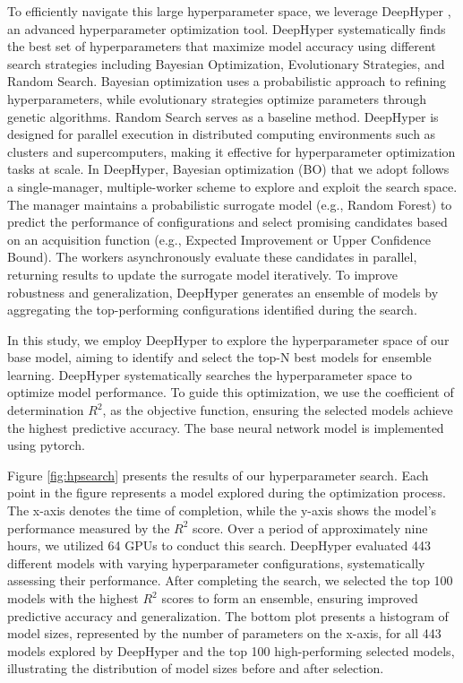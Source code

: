 \documentclass{jpp}
\begin{document}
To efficiently navigate this large hyperparameter space, we leverage DeepHyper \citep{balaprakash2018deephyper, egele2023asynchronous}, an advanced hyperparameter optimization tool. DeepHyper systematically finds the best set of hyperparameters that maximize model accuracy using different search strategies including Bayesian Optimization, Evolutionary Strategies, and Random Search. Bayesian optimization uses a probabilistic approach to refining hyperparameters, while evolutionary strategies optimize parameters through genetic algorithms. Random Search serves as a baseline method. DeepHyper is designed for parallel execution in distributed computing environments such as clusters and supercomputers, making it effective for  hyperparameter optimization tasks at scale. 
In DeepHyper, Bayesian optimization (BO) that we adopt  follows a single-manager, multiple-worker scheme to explore and exploit the search space. The manager maintains a probabilistic surrogate model (e.g., Random Forest) to predict the performance of configurations and select promising candidates based on an acquisition function (e.g., Expected Improvement or Upper Confidence Bound). The workers asynchronously evaluate these candidates in parallel, returning results to update the surrogate model iteratively. To improve robustness and generalization, DeepHyper generates an ensemble of models by aggregating the top-performing configurations identified during the search. 


In this study, we employ DeepHyper to explore the hyperparameter space of our base model, aiming to identify and select the top-N best models for ensemble learning. DeepHyper systematically searches the hyperparameter space to optimize model performance. To guide this optimization, we use the coefficient of determination $R^2$, as the objective function, ensuring the selected models achieve the highest predictive accuracy.
The base neural network model is implemented using pytorch.

Figure \ref{fig:hpsearch} presents the results of our hyperparameter search. Each point in the figure represents a model explored during the optimization process. The x-axis denotes the time of completion, while the y-axis shows the model’s performance measured by the $R^2$ score. Over a period of approximately nine hours, we utilized 64 GPUs to conduct this search. DeepHyper evaluated 443 different models with varying hyperparameter configurations, systematically assessing their performance. After completing the search, we selected the top 100 models with the highest $R^2$ scores to form an ensemble, ensuring improved predictive accuracy and generalization.
The bottom plot presents a histogram of model sizes, represented by the number of parameters on the x-axis, for all 443 models explored by DeepHyper and the top 100 high-performing selected models, illustrating the distribution of model sizes before and after selection.
\end{document}
